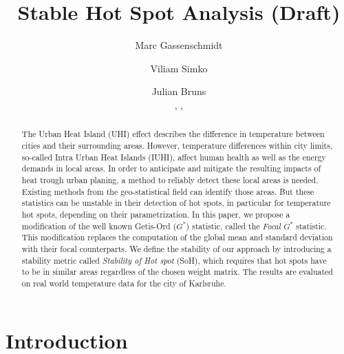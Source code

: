 \documentclass{itatnew}
\begin{document}
\title{Stable Hot Spot Analysis (Draft)}

\author{
  Marc Gassenschmidt \and
  Viliam Simko  \and
  Julian Bruns
  \\
  ,
  ,
}

  
\maketitle              %

\begin{abstract}
  The Urban Heat Island (UHI) effect describes the difference in temperature
  between cities and their surrounding areas. However, temperature differences
  within city limits, so-called Intra Urban Heat Islands (IUHI), affect human
  health as well as the energy demands in local areas. In order to anticipate
  and mitigate the resulting impacts of heat trough urban planing, a method to
  reliably detect these local areas is needed. Existing methods from the
  geo-statistical field can identify those areas. But these statistics can be
  unstable in their detection of hot spots, in particular for temperature hot
  spots, depending on their parametrization. In this paper, we propose a
  modification of the well known Getis-Ord ($G^*$) statistic, called the
  \emph{Focal $G^*$} statistic. This modification replaces the computation of
  the global mean and standard deviation with their focal counterparts. We
  define the stability of our approach by introducing a stability metric called
  \emph{Stability of Hot spot} (SoH), which requires that hot spots have to be
  in similar areas regardless of the chosen weight matrix. The results are
  evaluated on real world temperature data for the city of Karlsruhe.
\end{abstract}

\section{Introduction}
\end{document}
